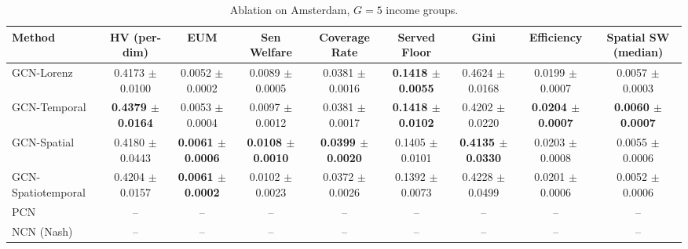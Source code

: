 \begin{table}[htbp]
\centering
\caption{Ablation on Amsterdam, $G=5$ income groups.}
\label{tab:ablation_amsterdam_g5}
\begin{tabular}{lcccccccc}
\toprule
Method & HV (per-dim) & EUM & Sen Welfare & Coverage Rate & Served Floor & Gini & Efficiency & Spatial SW (median) \\
\midrule
GCN-Lorenz & 0.4173 $\pm$ 0.0100 & 0.0052 $\pm$ 0.0002 & 0.0089 $\pm$ 0.0005 & 0.0381 $\pm$ 0.0016 & \textbf{0.1418 $\pm$ 0.0055} & 0.4624 $\pm$ 0.0168 & 0.0199 $\pm$ 0.0007 & 0.0057 $\pm$ 0.0003 \\
GCN-Temporal & \textbf{0.4379 $\pm$ 0.0164} & 0.0053 $\pm$ 0.0004 & 0.0097 $\pm$ 0.0012 & 0.0381 $\pm$ 0.0017 & \textbf{0.1418 $\pm$ 0.0102} & 0.4202 $\pm$ 0.0220 & \textbf{0.0204 $\pm$ 0.0007} & \textbf{0.0060 $\pm$ 0.0007} \\
GCN-Spatial & 0.4180 $\pm$ 0.0443 & \textbf{0.0061 $\pm$ 0.0006} & \textbf{0.0108 $\pm$ 0.0010} & \textbf{0.0399 $\pm$ 0.0020} & 0.1405 $\pm$ 0.0101 & \textbf{0.4135 $\pm$ 0.0330} & 0.0203 $\pm$ 0.0008 & 0.0055 $\pm$ 0.0006 \\
GCN-Spatiotemporal & 0.4204 $\pm$ 0.0157 & \textbf{0.0061 $\pm$ 0.0002} & 0.0102 $\pm$ 0.0023 & 0.0372 $\pm$ 0.0026 & 0.1392 $\pm$ 0.0073 & 0.4228 $\pm$ 0.0499 & 0.0201 $\pm$ 0.0006 & 0.0052 $\pm$ 0.0006 \\
PCN & -- & -- & -- & -- & -- & -- & -- & -- \\
NCN (Nash) & -- & -- & -- & -- & -- & -- & -- & -- \\
\bottomrule
\end{tabular}
\end{table}


